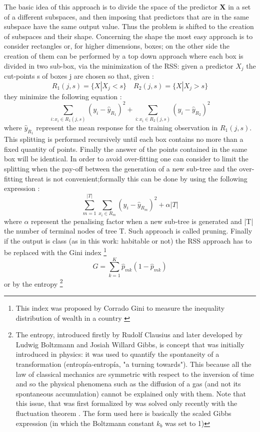 \documentclass[
12pt, %
a4paper, %
oneside, %
headinclude,footinclude, %
BCOR5mm, %
]{scrartcl}
\newcommand{\textgreek}[1]{\begingroup\fontencoding{LGR}\selectfont#1\endgroup}
\begin{document}
The basic idea of this approach is to divide the space of the predictor \textbf{X} in a set of a different subspaces, and then imposing that predictors that are in the same subspace have the same output value. Thus the problem is shifted to the creation of subspaces and their shape. Concerning the shape the most easy approach is to consider rectangles or, for higher dimensions, boxes; on the other side the creation of them can be performed by a top down approach where each box is divided in two sub-box, via the minimization of the RSS: given a predictor $X_{j}$ the cut-points s of boxes j are chosen so that, given \cite{james2013introduction}:   
\begin{equation}
R_{1}(j,s)= \{X | X_{j} < s \} \quad R_{2}(j,s)= \{X | X_{j} > s \}
\end{equation}
they minimize the following equation \cite{james2013introduction}: 
\begin{equation}
\sum_{i: x_{i} \in  R_{1}(j,s)}(y_{i}-\hat{y}_{R_{1}})^{2}+\sum_{i: x_{i} \in  R_{2}(j,s)}(y_{i}-\hat{y}_{R_{2}})^{2}
\end{equation}
where $\hat{y}_{R_{1}}$ represent the mean response for the training observation in $R_{1}(j,s)$. This splitting is performed recursively until each box contains no more than a fixed quantity of points. Finally the answer of the points contained in the same box will be identical. In order to avoid over-fitting one can consider to limit the splitting when the pay-off between the generation of a new sub-tree and the over-fitting threat is not convenient;formally this can be done by using the following expression \cite{james2013introduction}: 
\begin{equation}
\sum_{m=1}^{|T|}\sum_{x_{i}\in R_{m}}(y_{i}-\hat{y}_{R_{m}})^{2}+\alpha|T|
\end{equation}
where $\alpha$ represent the penalising factor when a new sub-tree is generated and |T| the number of terminal nodes of tree T. Such approach is called pruning. Finally if the output is class (as in this work: habitable or not) the RSS approach has to be replaced with the Gini index \footnote{This index was proposed by Corrado Gini to measure the inequality distribution of wealth in a country \cite{gini1912variabilita}}
\begin{equation}
G=\sum_{k=1}^{K}\hat{p}_{mk}(1-\hat{p}_{mk})
\end{equation}
or by the entropy \footnote{The entropy, introduced firstly by Rudolf Clausius and later developed by  Ludwig Boltzmann and Josiah Willard Gibbs, is concept that was initially introduced in physics: it was used to quantify the spontaneity of a transformation (\textgreek{entropía}-entropía, "a turning towards"). This because all the law of classical mechanics are symmetric with respect to the inversion of time and so the physical phenomena such as the diffusion of a gas (and not its spontaneous accumulation) cannot be explained only with them. Note that this issue, that was first formalized by \cite{loschmidt1876grosse,wu1975boltzmann}  was solved only recently with the fluctuation theorem \cite{evans1993probability,wang2002experimental}. The form used here is basically the scaled Gibbs expression (in which the Boltzmann constant $k_{b}$ was set to 1)}
\end{document}
